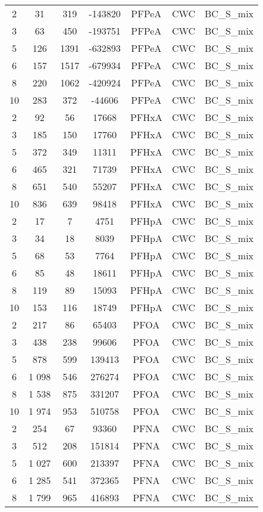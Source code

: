 \begin{longtable}[c]{ccccccc}
2 & 31 & 319 & -143820 & PFPeA & CWC & BC\_S\_mix \\
3 & 63 & 450 & -193751 & PFPeA & CWC & BC\_S\_mix \\
5 & 126 & 1391 & -632893 & PFPeA & CWC & BC\_S\_mix \\
6 & 157 & 1517 & -679934 & PFPeA & CWC & BC\_S\_mix \\
8 & 220 & 1062 & -420924 & PFPeA & CWC & BC\_S\_mix \\
10 & 283 & 372 & -44606 & PFPeA & CWC & BC\_S\_mix \\
2 & 92 & 56 & 17668 & PFHxA & CWC & BC\_S\_mix \\
3 & 185 & 150 & 17760 & PFHxA & CWC & BC\_S\_mix \\
5 & 372 & 349 & 11311 & PFHxA & CWC & BC\_S\_mix \\
6 & 465 & 321 & 71739 & PFHxA & CWC & BC\_S\_mix \\
8 & 651 & 540 & 55207 & PFHxA & CWC & BC\_S\_mix \\
10 & 836 & 639 & 98418 & PFHxA & CWC & BC\_S\_mix \\
2 & 17 & 7 & 4751 & PFHpA & CWC & BC\_S\_mix \\
3 & 34 & 18 & 8039 & PFHpA & CWC & BC\_S\_mix \\
5 & 68 & 53 & 7764 & PFHpA & CWC & BC\_S\_mix \\
6 & 85 & 48 & 18611 & PFHpA & CWC & BC\_S\_mix \\
8 & 119 & 89 & 15093 & PFHpA & CWC & BC\_S\_mix \\
10 & 153 & 116 & 18749 & PFHpA & CWC & BC\_S\_mix \\
2 & 217 & 86 & 65403 & PFOA & CWC & BC\_S\_mix \\
3 & 438 & 238 & 99606 & PFOA & CWC & BC\_S\_mix \\
5 & 878 & 599 & 139413 & PFOA & CWC & BC\_S\_mix \\
6 & 1 098 & 546 & 276274 & PFOA & CWC & BC\_S\_mix \\
8 & 1 538 & 875 & 331207 & PFOA & CWC & BC\_S\_mix \\
10 & 1 974 & 953 & 510758 & PFOA & CWC & BC\_S\_mix \\
2 & 254 & 67 & 93360 & PFNA & CWC & BC\_S\_mix \\
3 & 512 & 208 & 151814 & PFNA & CWC & BC\_S\_mix \\
5 & 1 027 & 600 & 213397 & PFNA & CWC & BC\_S\_mix \\
6 & 1 285 & 541 & 372365 & PFNA & CWC & BC\_S\_mix \\
8 & 1 799 & 965 & 416893 & PFNA & CWC & BC\_S\_mix \\

\end{longtable}
